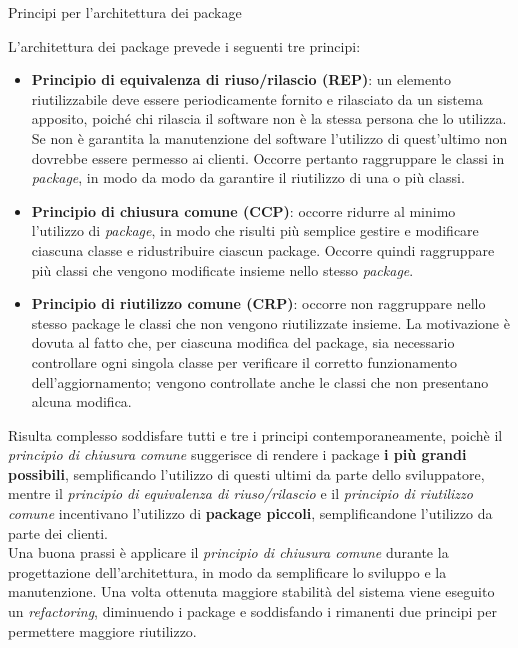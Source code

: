 \begin{problem}{1.16}
Principi per l'architettura dei package
\end{problem}
\begin{solution}
L'architettura dei package prevede i seguenti tre principi:
\begin{itemize}
	\item \textbf{Principio di equivalenza di riuso/rilascio (REP)}: un elemento riutilizzabile deve essere periodicamente fornito e rilasciato da un sistema apposito, poiché chi rilascia il software non è la stessa persona che lo utilizza.
	\newline
	Se non è garantita la manutenzione del software l'utilizzo di quest'ultimo non dovrebbe essere permesso ai clienti. Occorre pertanto raggruppare le classi in \textit{package}, in modo da modo da garantire il riutilizzo di una o più classi.
	\item \textbf{Principio di chiusura comune (CCP)}: occorre ridurre al minimo l'utilizzo di \textit{package}, in modo che risulti più semplice gestire e modificare ciascuna classe e ridustribuire ciascun package.
	\newline
	Occorre quindi raggruppare più classi che vengono modificate insieme nello stesso \textit{package}.
	\item \textbf{Principio di riutilizzo comune (CRP)}: occorre non raggruppare nello stesso package le classi che non vengono riutilizzate insieme.
	\newline La motivazione è dovuta al fatto che, per ciascuna modifica del package, sia necessario controllare ogni singola classe per verificare il corretto funzionamento dell'aggiornamento; vengono controllate anche le classi che non presentano alcuna modifica.
\end{itemize}
\raggedright Risulta complesso soddisfare tutti e tre i principi contemporaneamente, poichè il \textit{principio di chiusura comune} suggerisce di rendere i package \textbf{i più grandi possibili}, semplificando l'utilizzo di questi ultimi da parte dello sviluppatore, mentre il \textit{principio di equivalenza di riuso/rilascio} e il \textit{principio di riutilizzo comune} incentivano l'utilizzo di \textbf{package piccoli}, semplificandone l'utilizzo da parte dei clienti.
\\
Una buona prassi è applicare il \textit{principio di chiusura comune} durante la progettazione dell'architettura, in modo da semplificare lo sviluppo e la manutenzione. Una volta ottenuta maggiore stabilità del sistema viene eseguito un \textit{refactoring}, diminuendo i package e soddisfando i rimanenti due principi per permettere maggiore riutilizzo.

\end{solution}
